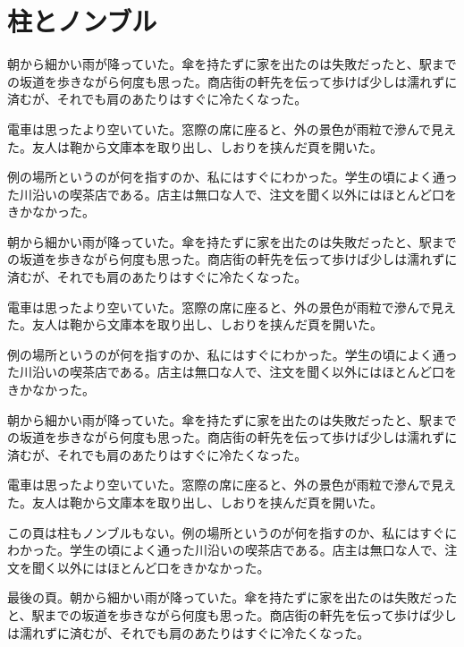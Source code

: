 \documentclass[a5paper,twoside]{ltjsarticle}
\begin{document}
\section{柱とノンブル}
朝から細かい雨が降っていた。傘を持たずに家を出たのは失敗だったと、駅までの坂道を歩きながら何度も思った。商店街の軒先を伝って歩けば少しは濡れずに済むが、それでも肩のあたりはすぐに冷たくなった。

電車は思ったより空いていた。窓際の席に座ると、外の景色が雨粒で滲んで見えた。友人は鞄から文庫本を取り出し、しおりを挟んだ頁を開いた。

例の場所というのが何を指すのか、私にはすぐにわかった。学生の頃によく通った川沿いの喫茶店である。店主は無口な人で、注文を聞く以外にはほとんど口をきかなかった。

朝から細かい雨が降っていた。傘を持たずに家を出たのは失敗だったと、駅までの坂道を歩きながら何度も思った。商店街の軒先を伝って歩けば少しは濡れずに済むが、それでも肩のあたりはすぐに冷たくなった。

電車は思ったより空いていた。窓際の席に座ると、外の景色が雨粒で滲んで見えた。友人は鞄から文庫本を取り出し、しおりを挟んだ頁を開いた。

例の場所というのが何を指すのか、私にはすぐにわかった。学生の頃によく通った川沿いの喫茶店である。店主は無口な人で、注文を聞く以外にはほとんど口をきかなかった。

朝から細かい雨が降っていた。傘を持たずに家を出たのは失敗だったと、駅までの坂道を歩きながら何度も思った。商店街の軒先を伝って歩けば少しは濡れずに済むが、それでも肩のあたりはすぐに冷たくなった。

電車は思ったより空いていた。窓際の席に座ると、外の景色が雨粒で滲んで見えた。友人は鞄から文庫本を取り出し、しおりを挟んだ頁を開いた。

\clearpage
\thispagestyle{empty}
この頁は柱もノンブルもない。例の場所というのが何を指すのか、私にはすぐにわかった。学生の頃によく通った川沿いの喫茶店である。店主は無口な人で、注文を聞く以外にはほとんど口をきかなかった。

\clearpage
最後の頁。朝から細かい雨が降っていた。傘を持たずに家を出たのは失敗だったと、駅までの坂道を歩きながら何度も思った。商店街の軒先を伝って歩けば少しは濡れずに済むが、それでも肩のあたりはすぐに冷たくなった。
\end{document}
